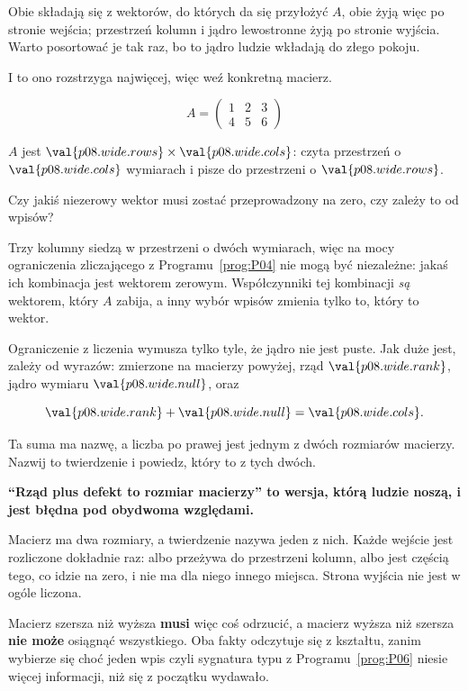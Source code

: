 \begin{fr}
Obie składają się z wektorów, do których da się przyłożyć $A$, obie żyją więc
po stronie wejścia; przestrzeń kolumn i jądro lewostronne żyją po stronie
wyjścia. Warto posortować je tak raz, bo to jądro ludzie wkładają do złego
pokoju.

I to ono rozstrzyga najwięcej, więc weź konkretną macierz.

\[ A = \begin{pmatrix} 1 & 2 & 3 \\ 4 & 5 & 6 \end{pmatrix} \]

$A$ jest $\val{p08.wide.rows} \times \val{p08.wide.cols}$: czyta przestrzeń o
$\val{p08.wide.cols}$ wymiarach i pisze do przestrzeni o
$\val{p08.wide.rows}$.

Czy jakiś niezerowy wektor musi zostać przeprowadzony na zero, czy zależy to od
wpisów?
\dotline
\nextframe
\end{fr}

\begin{fr}
Trzy kolumny siedzą w przestrzeni o dwóch wymiarach, więc na mocy
ograniczenia zliczającego z Programu~\ref{prog:P04} nie mogą być niezależne:
jakaś ich kombinacja jest wektorem zerowym. Współczynniki tej kombinacji
\emph{są} wektorem, który $A$ zabija, a inny wybór wpisów zmienia tylko to,
który to wektor.

Ograniczenie z liczenia wymusza tylko tyle, że jądro nie jest puste. Jak duże
jest, zależy od wyrazów: zmierzone na macierzy powyżej, rząd
$\val{p08.wide.rank}$, jądro wymiaru $\val{p08.wide.null}$, oraz

\[ \val{p08.wide.rank} + \val{p08.wide.null} = \val{p08.wide.cols}. \]

Ta suma ma nazwę, a liczba po prawej jest jednym z dwóch rozmiarów macierzy.
Nazwij to twierdzenie i powiedz, który to z tych dwóch.
\dotline
\nextframe
\end{fr}

\begin{fr}
\begin{trapbox}
\textbf{\enquote{Rząd plus defekt to rozmiar macierzy} to wersja, którą ludzie
noszą, i jest błędna pod obydwoma względami.}

Macierz ma dwa rozmiary, a twierdzenie nazywa jeden z nich. Każde wejście jest
rozliczone dokładnie raz: albo przeżywa do przestrzeni kolumn, albo jest
częścią tego, co idzie na zero, i nie ma dla niego innego miejsca. Strona
wyjścia nie jest w ogóle liczona.

Macierz szersza niż wyższa \textbf{musi} więc coś odrzucić, a macierz wyższa
niż szersza \textbf{nie może} osiągnąć wszystkiego. Oba fakty odczytuje się z
kształtu, zanim wybierze się choć jeden wpis \dash{} czyli sygnatura typu z
Programu~\ref{prog:P06} niesie więcej informacji, niż się z początku wydawało.
\end{trapbox}
\end{fr}


